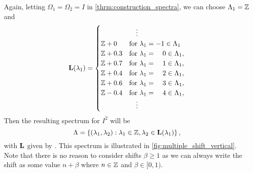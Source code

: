 \documentclass[../thesis.tex]{subfiles}
\begin{document}
\begin{example}\label{ex:multiple_shift_vertical}
    Again, letting $\Omega_1=\Omega_2 = I$ in \cref{thrm:construction_spectra}, we can choose $\Lambda_1 = \mathbb{Z}$ and 
    \begin{align}\label{eq:multiple_shift_vertical}
        \mathbf{L}(\lambda_1) = \begin{cases}
            & \text{ \space \space }\vdots\\        
            \mathbb{Z}+0 & \text{for } \lambda_1 = -1 \in \Lambda_1\\
            \mathbb{Z}+0.3 & \text{for } \lambda_1 = \text{\space\space\space} 0 \in \Lambda_1,\\
            \mathbb{Z}+0.7 & \text{for } \lambda_1 = \text{\space\space\space} 1 \in \Lambda_1,\\
            \mathbb{Z}+0.4 & \text{for } \lambda_1 = \text{\space\space\space} 2 \in \Lambda_1,\\
            \mathbb{Z}+0.6 & \text{for } \lambda_1 = \text{\space\space\space} 3 \in \Lambda_1,\\
            \mathbb{Z}-0.4 & \text{for } \lambda_1 = \text{\space\space\space} 4 \in \Lambda_1,\\
            & \text{ \space \space }\vdots
        \end{cases}
    \end{align}
    Then the resulting spectrum for $I^2$ will be
    \begin{equation}\label{eq:lam_multiple_shift_vertical}
        \Lambda = \left\{(\lambda_1, \lambda_2): \lambda_1\in \mathbb{Z}, \lambda_2 \in \mathbf{L}(\lambda_1)\right\},
    \end{equation}
    with $\mathbf{L}$ given by . This spectrum is illustrated in \cref{fig:multiple_shift_vertical}. Note that there is no reason to consider shifts $\beta \geq 1$ as we can always write the shift as some value $n+\beta$ where $n\in \mathbb{Z}$ and $\beta \in [0,1)$.
\end{example}
%
\end{document}
